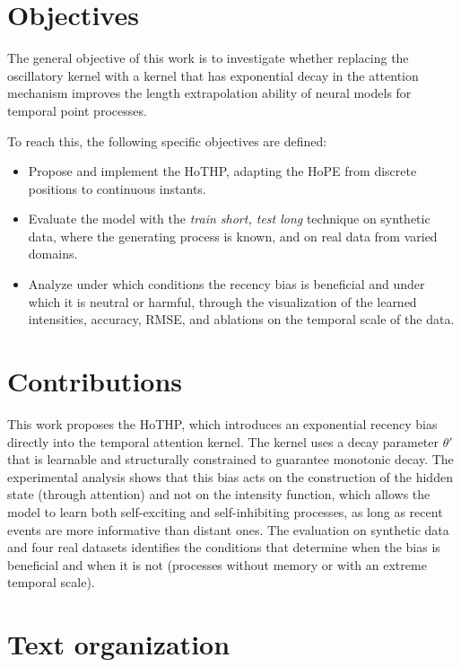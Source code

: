 \section{Objectives}

The general objective of this work is to investigate whether replacing the oscillatory kernel with a kernel that has exponential decay in the attention mechanism improves the length extrapolation ability of neural models for temporal point processes.

To reach this, the following specific objectives are defined:

\begin{itemize}
    \item Propose and implement the HoTHP, adapting the HoPE \cite{dai_hope_2025} from discrete positions to continuous instants.
    \item Evaluate the model with the \textit{train short, test long} technique on synthetic data, where the generating process is known, and on real data from varied domains.
    \item Analyze under which conditions the recency bias is beneficial and under which it is neutral or harmful, through the visualization of the learned intensities, accuracy, \gls{RMSE}, and ablations on the temporal scale of the data.
\end{itemize}

\section{Contributions}

This work proposes the HoTHP, which introduces an exponential recency bias directly into the temporal attention kernel. The kernel uses a decay parameter $\theta'$ that is learnable and structurally constrained to guarantee monotonic decay. The experimental analysis shows that this bias acts on the construction of the hidden state (through attention) and not on the intensity function, which allows the model to learn both self-exciting and self-inhibiting processes, as long as recent events are more informative than distant ones. The evaluation on synthetic data and four real datasets identifies the conditions that determine when the bias is beneficial and when it is not (processes without memory or with an extreme temporal scale).

\section{Text organization}

